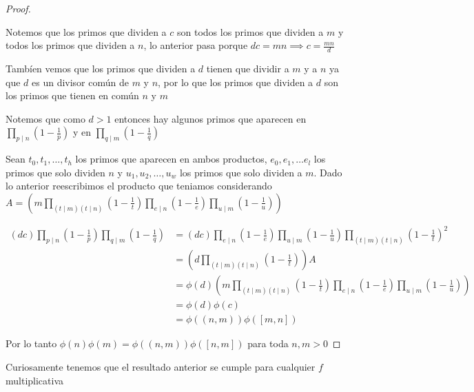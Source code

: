 \documentclass[12pt]{article}
\begin{document}
\begin{enumerate}
\begin{proof}
\begin{itemize}
                Notemos que los primos que dividen a $c$ son todos los primos que dividen a $m$ y todos los primos que dividen a $n$, lo anterior pasa porque $dc = mn \implies c = \frac{mn}{d}$
                
                Tambíen vemos que los primos que dividen a $d$ tienen que dividir a $m$ y a $n$ ya que $d$ es un divisor común de $m$ y $n$, por lo que los primos que dividen a $d$ son los primos que tienen en común $n$ y $m$
                
                Notemos que como $d > 1$ entonces hay algunos primos que aparecen en $\prod_{p \mid n} (1 - \frac{1}{p})$ y en $\prod_{q \mid m} (1 - \frac{1}{q})$
                
                Sean $t_0,t_1,\dots, t_h$ los primos que aparecen en ambos productos, $e_0, e_1, \dots e_l$ los primos que solo dividen $n$ y $u_1,u_2, \dots, u_w$ los primos que solo dividen a $m$. Dado lo anterior reescribimos el producto que teniamos considerando $A = (m  \prod_{(t \mid m)(t \mid n)} (1 - \frac{1}{t}) \prod_{e \mid n} (1 - \frac{1}{e}) \prod_{u \mid m} (1 - \frac{1}{u}))$
                
                
                \begin{align*}
                     (dc) \prod_{p \mid n} (1 - \frac{1}{p}) \prod_{q \mid m} (1 - \frac{1}{q}) 
                     &= (dc) \prod_{e \mid n} (1 - \frac{1}{e}) \prod_{u \mid m} (1 - \frac{1}{u}) \prod_{(t \mid m)(t \mid n)} (1 - \frac{1}{t})^2 \\
                     &= (d  \prod_{(t \mid m)(t \mid n)} (1 - \frac{1}{t})) A \\
                     &= \phi(d) (m  \prod_{(t \mid m)(t \mid n)} (1 - \frac{1}{t}) \prod_{e \mid n} (1 - \frac{1}{e}) \prod_{u \mid m} (1 - \frac{1}{u})) \\
                     &= \phi(d) \phi(c) \\
                     &= \phi((n,m)) \phi([m,n])
                \end{align*}
                
                
            \end{itemize}
            
            Por lo tanto $\phi(n)\phi(m) = \phi((n,m)) \phi([n,m])$ para toda $n,m > 0$
            
            \end{proof}
            
            Curiosamente tenemos que el resultado anterior se cumple para cualquier $f$ multiplicativa
            

\end{enumerate}
\end{document}
